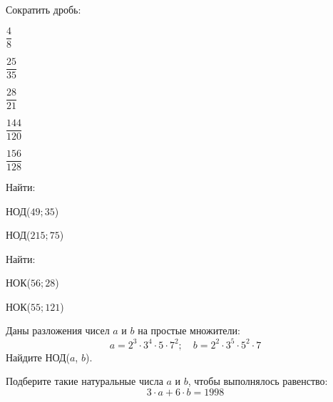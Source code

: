 \setlength\fboxrule{1.2pt}
\begin{listofex}
	\item Сократить дробь:
	\begin{enumcols}[itemcolumns=5]
		\item \( \dfrac{4}{8} \)
		\item \( \dfrac{25}{35} \)
		\item \( \dfrac{28}{21} \)
		\item \( \dfrac{144}{120} \)
		\item \( \dfrac{156}{128} \)
	\end{enumcols}
	\item Найти:
	\begin{enumcols}[itemcolumns=2]
		\item НОД(\( 49; 35 \))
		\item НОД(\( 215; 75 \))
	\end{enumcols}
	\item Найти:
	\begin{enumcols}[itemcolumns=2]
		\item НОК(\( 56; 28 \))
		\item НОК(\( 55; 121 \))
	\end{enumcols}
	\item Даны разложения чисел \( a \) и \( b \) на простые множители:
	\[ a=2^3\cdot3^4\cdot5\cdot7^2;\quad b=2^2\cdot3^5\cdot5^2\cdot7 \]
	Найдите НОД(\( a\), \( b \)).
	\item Подберите такие натуральные числа \( a \) и \( b \), чтобы выполнялось равенство: \[ 3\cdot a + 6\cdot b = 1998 \]
\end{listofex}